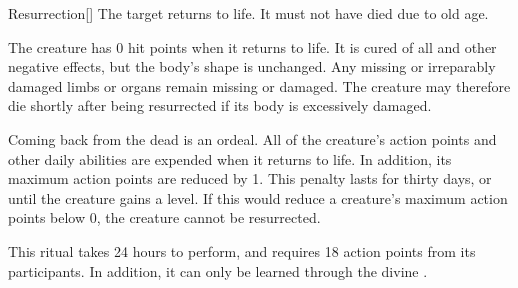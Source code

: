 \lowercase{\hypertarget{spell:Resurrection}{}}\label{spell:Resurrection}
\begin{apability}[Rank 4]{\hypertarget{spell:Resurrection}{Resurrection}}[]
The target returns to life.
It must not have died due to old age.

The creature has 0 hit points when it returns to life.
It is cured of all  and other negative effects, but the body's shape is unchanged.
Any missing or irreparably damaged limbs or organs remain missing or damaged.
The creature may therefore die shortly after being resurrected if its body is excessively damaged.

Coming back from the dead is an ordeal.
All of the creature's action points and other daily abilities are expended when it returns to life.
In addition, its maximum action points are reduced by 1.
This penalty lasts for thirty days, or until the creature gains a level.
If this would reduce a creature's maximum action points below 0, the creature cannot be resurrected.

This ritual takes 24 hours to perform, and requires 18 action points from its participants.
In addition, it can only be learned through the divine .
\end{apability}
\vspace{0.25em}



